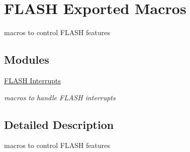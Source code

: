 \hypertarget{group___f_l_a_s_h___exported___macros}{\section{F\-L\-A\-S\-H Exported Macros}
\label{group___f_l_a_s_h___exported___macros}
}


macros to control F\-L\-A\-S\-H features  


\subsection*{Modules}
\begin{DoxyCompactItemize}
\item 
\hyperlink{group___f_l_a_s_h___interrupt}{F\-L\-A\-S\-H Interrupts}
\begin{DoxyCompactList}\small\item\em macros to handle F\-L\-A\-S\-H interrupts \end{DoxyCompactList}\end{DoxyCompactItemize}


\subsection{Detailed Description}
macros to control F\-L\-A\-S\-H features 